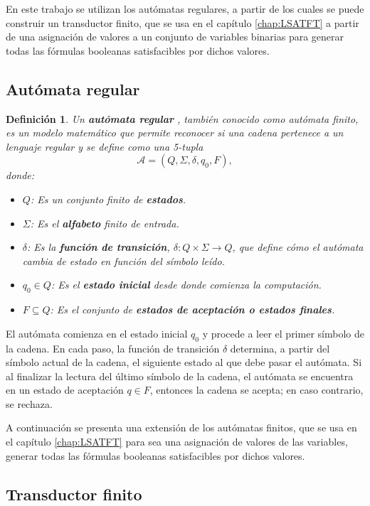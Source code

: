 \documentclass[12pt]{article}
\newtheorem{definition}{Definición}
\begin{document}
En este trabajo se utilizan los autómatas regulares, a partir de los cuales se puede construir un transductor finito, 
que se usa en el capítulo \ref{chap:LSATFT} a partir de una asignación de valores a un conjunto de variables binarias para generar 
todas las fórmulas booleanas satisfacibles por dichos valores.

\subsection{Autómata regular}

\begin{definition}
  Un \textbf{autómata regular} \cite{authomataTheory}, también conocido como autómata finito, es un modelo matemático que permite reconocer si una cadena pertenece a un lenguaje regular y se define como una 5-tupla $$\mathcal{A} = (Q, \Sigma, \delta, q_0, F),$$ donde:
  
  \begin{itemize}
    \item $Q$: Es un conjunto finito de \textbf{estados}.
    \item $\Sigma$: Es el \textbf{alfabeto} finito de entrada.
    \item $\delta$: Es la \textbf{función de transición}, $\delta: Q \times \Sigma \to Q$, que define cómo el autómata cambia de estado en función del símbolo leído.
    \item $q_0 \in Q$: Es el \textbf{estado inicial} desde donde comienza la computación.
    \item $F \subseteq Q$: Es el conjunto de \textbf{estados de aceptación o estados finales}.
  \end{itemize}
\end{definition}


El autómata comienza en el estado inicial $q_0$ y procede a leer el primer símbolo de la cadena.  En cada paso, la función de transición $\delta$ determina, a partir del símbolo actual de la cadena, el siguiente estado al que debe pasar el autómata.  Si al finalizar la lectura del último símbolo de la cadena, el autómata se encuentra en un estado de aceptación $q \in F$, entonces la cadena se acepta; en caso contrario, se rechaza.

A continuación se presenta una extensión de los autómatas finitos, que se usa en el capítulo \ref{chap:LSATFT}
para sea una asignación de valores de las variables, generar todas las fórmulas booleanas satisfacibles por dichos valores.

\subsection{Transductor finito}
\end{document}
